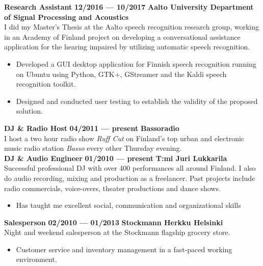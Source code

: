 \documentclass[8pt,a4paper,oneside]{article}
\newcommand{\myrule}{\vspace{0.5mm} {\color{lightgray}{\hrule height 0.5pt width \textwidth depth 0pt}} \vspace{1mm}}
\newcommand{\titledate}[2]{{\bfseries \color{textcolor}  \fontsize{12}{12}\selectfont #1} \hfill \textbf{#2} \myrule}
\newcommand{\workplace}[1]{{\bfseries \fontsize{11}{11}\selectfont #1}}
\newcommand{\sectitle}[1]{{\sc \bfseries \LARGE #1}}
\newcommand{\boxarc}{2.5mm}
\newcommand{\boxtop}{1.5mm}
\begin{document}
\begin{minipage}[t]{0.638\textwidth}
\begin{tcolorbox}[top=1mm,bottom=1mm,right=1mm,left=1mm,arc=\boxarc,toptitle=\boxtop,bottomtitle=1mm,title=\sectitle{Experience},box align=bottom]
	\titledate{Research Assistant}{12/2016 --- 10/2017}
	\workplace{Aalto University Department of Signal Processing and Acoustics} \\
	I did my Master’s Thesis at the Aalto speech recognition research group, working in an Academy of Finland project on developing a conversational assistance application for the hearing impaired by utilizing automatic speech recognition.
	\begin{itemize}[leftmargin=0.4cm, itemsep=0.5mm,parsep=0pt,topsep=0.5mm,label={\large\textbullet},before=\itshape]
		\small
		\item Developed a GUI desktop application for Finnish speech recognition running on Ubuntu using Python, GTK+, GStreamer and the Kaldi speech recognition toolkit.
		\item Designed and conducted user testing to establish the validity of the proposed solution. \\
	\end{itemize}
	
	\titledate{DJ \& Radio Host}{04/2011 --- present}
	\workplace{Bassoradio} \\
	I host a two hour radio show \textit{Ruff Cut} on Finland’s top urban and electronic music radio station \textit{Basso} every other Thursday evening. \\
	
	\titledate{DJ \& Audio Engineer}{01/2010 --- present}
	\workplace{T:mi Juri Lukkarila} \\
	Successful professional DJ with over 400 performances all around Finland. I also do audio recording, mixing and production as a freelancer. Past projects include radio commercials, voice-overs, theater productions and dance shows.
	\begin{itemize}[leftmargin=0.4cm, itemsep=0.5mm,parsep=0pt,topsep=0.5mm,label={\large\textbullet},before=\itshape]
		\small
		\item Has taught me excellent social, communication and organizational skills \\
	\end{itemize}
	
	\titledate{Salesperson }{02/2010 --- 01/2013}
	\workplace{Stockmann Herkku Helsinki} \\
	Night and weekend salesperson at the Stockmann flagship grocery store.
	\begin{itemize}[leftmargin=0.4cm, itemsep=0.5mm,parsep=0pt,topsep=0.5mm,label={\large\textbullet},before=\itshape]
		\small
		\item Customer service and inventory management in a fast-paced working environment.
	\end{itemize}
	\end{tcolorbox}
	
\end{minipage}%
\end{document}
